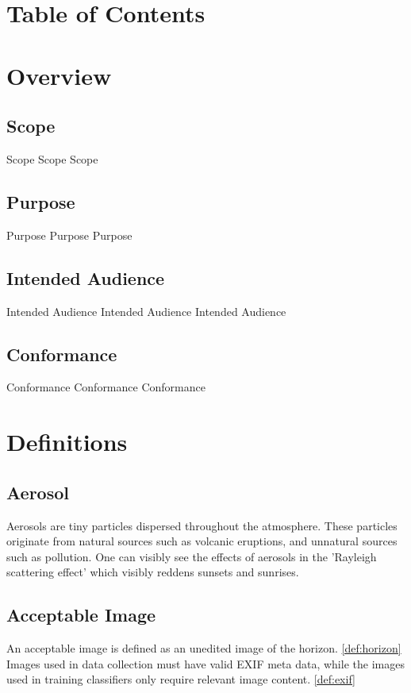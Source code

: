 \documentclass[onecolumn, draftclsnofoot,10pt, compsoc]{IEEEtran}
\begin{document}
\section{Table of Contents}
\tableofcontents
\clearpage

\begin{singlespace}
\section{Overview}
	\subsection{Scope}
		Scope Scope Scope
	\subsection{Purpose}
		Purpose Purpose Purpose
	\subsection{Intended Audience}
		Intended Audience Intended Audience Intended Audience
	\subsection{Conformance}
		Conformance Conformance Conformance

\section{Definitions}
	
	\subsection{Aerosol}\label{def:aerosol}
		Aerosols are tiny particles dispersed throughout the atmosphere.
		These particles originate from natural sources such as volcanic eruptions, and unnatural sources such as pollution. 
		One can visibly see the effects of aerosols in the 'Rayleigh scattering effect'  which visibly reddens sunsets and sunrises. \cite{allen_2015}
	
	\subsection{Acceptable Image}\label{def:accImg}
		An acceptable image is defined as an unedited image of the horizon. \ref{def:horizon}
		Images used in data collection must have valid EXIF meta data, while the images used in training classifiers only require relevant image content. \ref{def:exif}
	

\end{singlespace}
\end{document}
